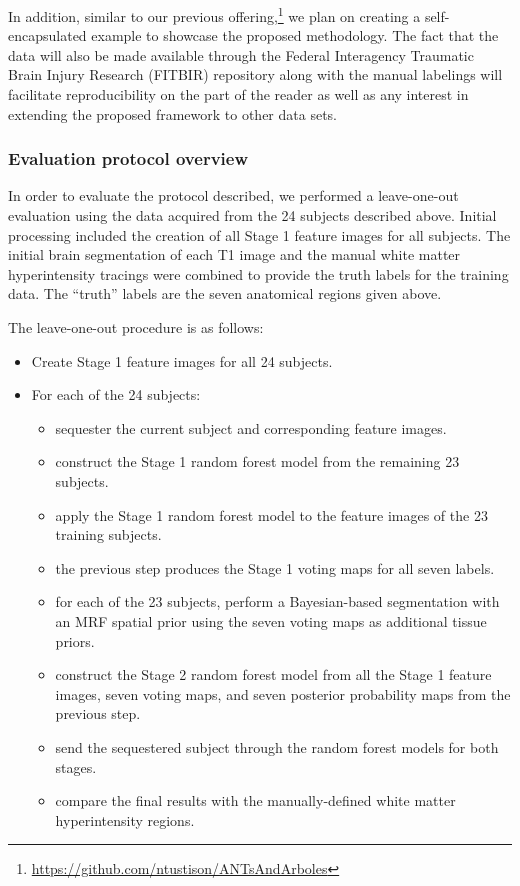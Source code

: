 \documentclass[11pt,]{article}
\providecommand{\tightlist}{%
  \setlength{\itemsep}{0pt}\setlength{\parskip}{0pt}}
\let\rmarkdownfootnote\footnote%
\def\footnote{\protect\rmarkdownfootnote}
\begin{document}
In addition, similar to our previous offering,\footnote{\url{https://github.com/ntustison/ANTsAndArboles}}
we plan on creating a self-encapsulated example to showcase the proposed
methodology. The fact that the data will also be made available through
the Federal Interagency Traumatic Brain Injury Research (FITBIR)
repository along with the manual labelings will facilitate
reproducibility on the part of the reader as well as any interest in
extending the proposed framework to other data sets.

\subsubsection{Evaluation protocol
overview}\label{evaluation-protocol-overview}

In order to evaluate the protocol described, we performed a
leave-one-out evaluation using the data acquired from the 24 subjects
described above. Initial processing included the creation of all Stage 1
feature images for all subjects. The initial brain segmentation of each
T1 image and the manual white matter hyperintensity tracings were
combined to provide the truth labels for the training data. The
``truth'' labels are the seven anatomical regions given above.

The leave-one-out procedure is as follows:

\begin{itemize}
\tightlist
\item
  Create Stage 1 feature images for all 24 subjects.
\item
  For each of the 24 subjects:

  \begin{itemize}
  \tightlist
  \item
    sequester the current subject and corresponding feature images.
  \item
    construct the Stage 1 random forest model from the remaining 23
    subjects.
  \item
    apply the Stage 1 random forest model to the feature images of the
    23 training subjects.
  \item
    the previous step produces the Stage 1 voting maps for all seven
    labels.
  \item
    for each of the 23 subjects, perform a Bayesian-based segmentation
    with an MRF spatial prior using the seven voting maps as additional
    tissue priors.
  \item
    construct the Stage 2 random forest model from all the Stage 1
    feature images, seven voting maps, and seven posterior probability
    maps from the previous step.
  \item
    send the sequestered subject through the random forest models for
    both stages.
  \item
    compare the final results with the manually-defined white matter
    hyperintensity regions.
  \end{itemize}
\end{itemize}
\end{document}
